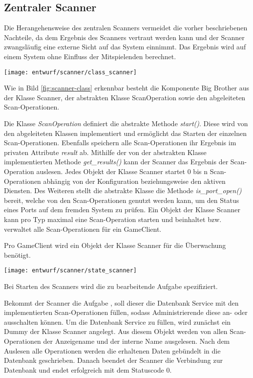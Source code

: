 \subsection{Zentraler Scanner}
Die Herangehensweise des zentralen Scanners vermeidet die vorher beschriebenen Nachteile, da dem Ergebnis des Scanners vertraut werden kann und der Scanner zwangsläufig eine externe Sicht auf das System einnimmt. Das Ergebnis wird auf einem System ohne Einfluss der Mitspielenden berechnet.

\begin{center}
	\texttt{[image: entwurf/scanner/class\_scanner]}
	\label{fig:scanner-class}
\end{center}

Wie in Bild \ref{fig:scanner-class} erkennbar besteht die Komponente Big Brother aus der Klasse Scanner, der abstrakten Klasse ScanOperation sowie den abgeleiteten Scan-Operationen.

Die Klasse \textit{ScanOperation} definiert die abstrakte Methode \textit{start()}. Diese wird von den abgeleiteten Klassen implementiert und ermöglicht das Starten der einzelnen Scan-Operationen. Ebenfalls speichern alle Scan-Operationen ihr Ergebnis im privaten Attribute \textit{result} ab. Mithilfe der von der abstrakten Klasse implementierten Methode \textit{get\_results()} kann der Scanner das Ergebnis der Scan-Operation auslesen. Jedes Objekt der Klasse Scanner startet 0 bis n Scan-Operationen abhängig von der Konfiguration beziehungsweise den aktiven Diensten. Des Weiteren stellt die abstrakte Klasse die Methode \textit{is\_port\_open()} bereit, welche von den Scan-Operationen genutzt werden kann, um den Status eines Ports auf dem fremden System zu prüfen. Ein Objekt der Klasse Scanner kann pro Typ maximal eine Scan-Operation starten und beinhaltet bzw. verwaltet alle Scan-Operationen für ein GameClient. 

Pro GameClient wird ein Objekt der Klasse Scanner für die Überwachung benötigt.

\begin{center}
	\texttt{[image: entwurf/scanner/state\_scanner]}
	\label{fig:scanner-state}
\end{center}

Bei Starten des Scanners wird die zu bearbeitende Aufgabe spezifiziert.

Bekommt der Scanner die Aufgabe , soll dieser die Datenbank Service mit den implementierten Scan-Operationen füllen, sodass Administrierende diese an- oder ausschalten können. Um die Datenbank Service zu füllen, wird zunächst ein Dummy der Klasse Scanner angelegt. Aus diesem Objekt werden von allen Scan-Operationen der Anzeigename und der interne Name ausgelesen. Nach dem Auslesen alle Operationen werden die erhaltenen Daten gebündelt in die Datenbank geschrieben. Danach beendet der Scanner die Verbindung zur Datenbank und endet erfolgreich mit dem Statuscode 0.

